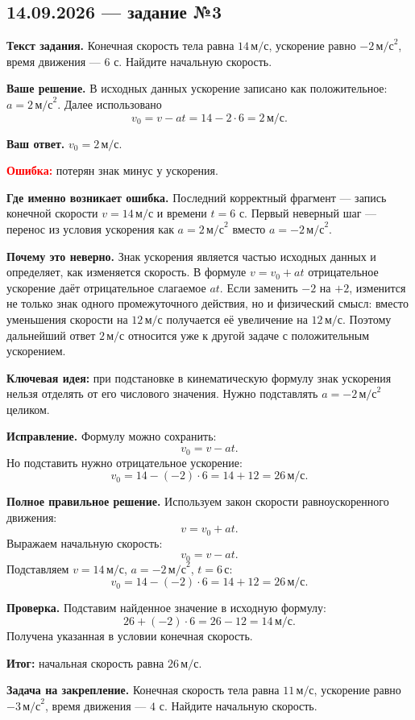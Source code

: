 \documentclass[12pt,a4paper]{article}
\newcommand{\taskhead}[1]{\subsection*{#1}}
\newcommand{\field}[1]{\textbf{#1}}
\begin{document}
\newpage
{}\label{task:14-3}
\taskhead{14.09.2026 --- задание №3}

\field{Текст задания.} Конечная скорость тела равна $14\,\text{м/с}$, ускорение равно $-2\,\text{м/с}^2$, время движения --- $6$ с. Найдите начальную скорость.

\field{Ваше решение.} В исходных данных ускорение записано как положительное: $a=2\,\text{м/с}^2$. Далее использовано
\[
v_0=v-at=14-2\cdot6=2\,\text{м/с}.
\]

\field{Ваш ответ.} $v_0=2\,\text{м/с}$.

\textcolor{red}{\textbf{Ошибка:}} потерян знак минус у ускорения.

\field{Где именно возникает ошибка.} Последний корректный фрагмент --- запись конечной скорости $v=14\,\text{м/с}$ и времени $t=6$ с. Первый неверный шаг --- перенос из условия ускорения как $a=2\,\text{м/с}^2$ вместо $a=-2\,\text{м/с}^2$.

\field{Почему это неверно.} Знак ускорения является частью исходных данных и определяет, как изменяется скорость. В формуле $v=v_0+at$ отрицательное ускорение даёт отрицательное слагаемое $at$. Если заменить $-2$ на $+2$, изменится не только знак одного промежуточного действия, но и физический смысл: вместо уменьшения скорости на $12\,\text{м/с}$ получается её увеличение на $12\,\text{м/с}$. Поэтому дальнейший ответ $2\,\text{м/с}$ относится уже к другой задаче с положительным ускорением.

\textcolor{blue!60!black}{\textbf{Ключевая идея:}} при подстановке в кинематическую формулу знак ускорения нельзя отделять от его числового значения. Нужно подставлять $a=-2\,\text{м/с}^2$ целиком.

\field{Исправление.} Формулу можно сохранить:
\[
v_0=v-at.
\]
Но подставить нужно отрицательное ускорение:
\[
v_0=14-(-2)\cdot6=14+12=26\,\text{м/с}.
\]

\field{Полное правильное решение.} Используем закон скорости равноускоренного движения:
\[
v=v_0+at.
\]
Выражаем начальную скорость:
\[
v_0=v-at.
\]
Подставляем $v=14\,\text{м/с}$, $a=-2\,\text{м/с}^2$, $t=6\,\text{с}$:
\[
v_0=14-(-2)\cdot6=14+12=26\,\text{м/с}.
\]

\field{Проверка.} Подставим найденное значение в исходную формулу:
\[
26+(-2)\cdot6=26-12=14\,\text{м/с}.
\]
Получена указанная в условии конечная скорость.

\textcolor{teal!60!black}{\textbf{Итог:}} начальная скорость равна $26\,\text{м/с}$.

\field{Задача на закрепление.} Конечная скорость тела равна $11\,\text{м/с}$, ускорение равно $-3\,\text{м/с}^2$, время движения --- $4$ с. Найдите начальную скорость.
\end{document}
